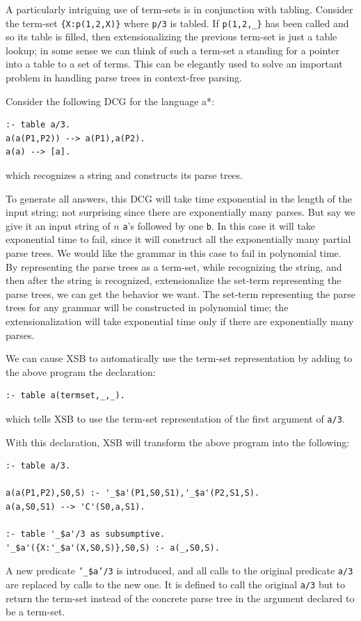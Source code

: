 A particularly intriguing use of term-sets is in conjunction with
tabling.  Consider the term-set \verb|{X:p(1,2,X)}| where {\tt p/3} is
tabled.  If \verb|p(1,2,_}| has been called and so its table is
filled, then extensionalizing the previous term-set is just a table
lookup; in some sense we can think of such a term-set a standing for a
pointer into a table to a set of terms.  This can be elegantly used to
solve an important problem in handling parse trees in context-free
parsing.

Consider the following DCG for the language a*:
\begin{verbatim}
:- table a/3.
a(a(P1,P2)) --> a(P1),a(P2).
a(a) --> [a].
\end{verbatim}
which recognizes a string and constructs its parse trees.

To generate all answers, this DCG will take time exponential in the
length of the input string; not surprising since there are
exponentially many parses.  But say we give it an input string of $n$
{\tt a}'s followed by one {\tt b}.  In this case it will take
exponential time to fail, since it will construct all the
exponentially many partial parse trees.  We would like the grammar in
this case to fail in polynomial time.  By representing the parse trees
as a term-set, while recognizing the string, and then after the string
is recognized, extensionalize the set-term representing the parse
trees, we can get the behavior we want.  The set-term representing the
parse trees for any grammar will be constructed in polynomial time;
the extensionalization will take exponential time only if there are
exponentially many parses.

We can cause XSB to automatically use the term-set representation by
adding to the above program the declaration:
\begin{verbatim}
:- table a(termset,_,_).
\end{verbatim}
which tells XSB to use the term-set representation of the first
argument of {\tt a/3}.

With this declaration, XSB will transform the above program into the
following:
\begin{verbatim}
:- table a/3.

a(a(P1,P2),S0,S) :- '_$a'(P1,S0,S1),'_$a'(P2,S1,S).
a(a,S0,S1) --> 'C'(S0,a,S1).

:- table '_$a'/3 as subsumptive.
'_$a'({X:'_$a'(X,S0,S)},S0,S) :- a(_,S0,S).
\end{verbatim}
A new predicate {\tt '\_\$a'/3} is introduced, and all calls to the
original predicate {\tt a/3} are replaced by calls to the new one.  It
is defined to call the original {\tt a/3} but to return the term-set
instead of the concrete parse tree in the argument declared to be a
term-set.

